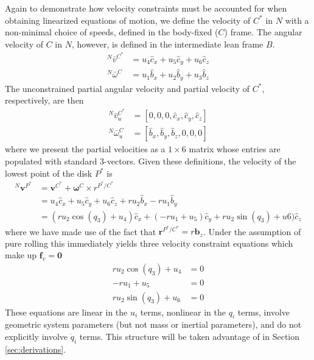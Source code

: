 \documentclass[smallcondensed,final]{svjour3}                     %
\begin{document}
Again to demonstrate how velocity constraints must be accounted for when
obtaining linearized equations of motion, we define the velocity of $C^*$ in
$N$ with a non-minimal choice of speeds, defined in the body-fixed ($C$) frame.
The angular velocity of $C$ in $N$, however, is defined in the intermediate
lean frame $B$.
\begin{align}
  \label{v_u}
  {^N}\bar{v}^{C^*} &= u_4 \hat{c}_x + u_5 \hat{c}_y + u_6 \hat{c}_z \\
  \label{w_u}
  {^N}\bar{\omega}^C &= u_1 \hat{b}_x + u_2 \hat{b}_y + u_3 \hat{b}_z
\end{align}
The unconstrained partial angular velocity and partial velocity of $C^*$,
respectively, are then
\begin{align}
  {^N}\bar{v}^{C^*}_u &= [0, 0, 0, \hat{c}_x, \hat{c}_y, \hat{c}_z] \\
  {^N}\bar{\omega}^C_u &= [\hat{b}_x, \hat{b}_y, \hat{b}_z, 0, 0, 0]
\end{align}
where we present the partial velocities as a $1\times6$ matrix whose entries
are populated with standard 3-vectors. Given these definitions, the velocity of
the lowest point of the disk $P^*$ is
\begin{align*}
    {^N}\bm{v}^{P^*} &= \bm{v}^{C^*} + \bm{\omega}^{C} \times r^{P^*/C^*} \\
                     &= u_4\hat{c}_x + u_5\hat{c}_y + u_6\hat{c}_z + r u_2
                        \hat{b}_x - r u_1 \hat{b}_y \\
                     &= (r u_2 \cos(q_3) + u_4) \hat{c}_x + (-r
                        u_1 + u_5)\hat{c}_y + r u_2 \sin(q_3) +
                        u6) \hat{c}_z
\end{align*}
where we have made use of the fact that $\bm{r}^{P^*/C^*} = r\bm{b}_z$.
Under the assumption of pure rolling this immediately yields three velocity
constraint equations which make up $\mathbf{f}_v = \mathbf{0}$
\begin{subequations}
\label{rd:f_v}
\begin{align}
    r u_2 \cos(q_3) + u_4 &= 0\\
            -r u_1 + u_5 &= 0\\
    r u_2 \sin(q_3) + u_6 &= 0
\end{align}
\end{subequations}
These equations are linear in the $u_i$ terms, nonlinear in the $q_i$ terms,
involve geometric system parameters (but not mass or inertial parameters), and
do not explicitly involve $\dot{q}_i$ terms. This structure will be taken
advantage of in Section \ref{sec:derivations}.
\end{document}
